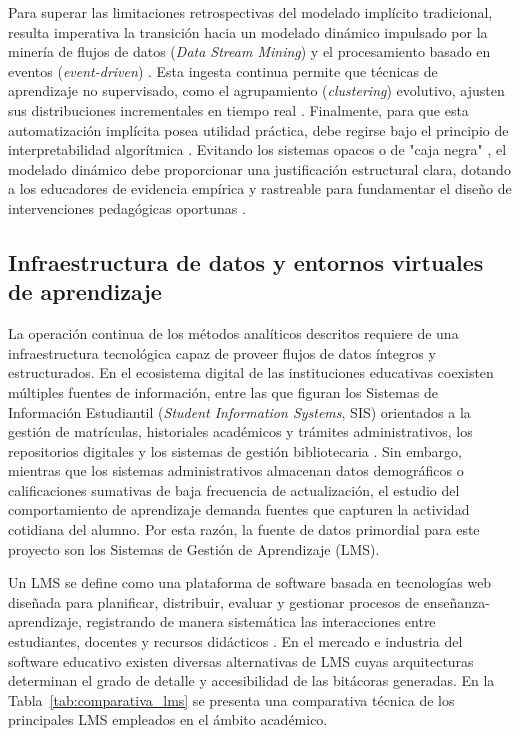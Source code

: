 Para superar las limitaciones retrospectivas del modelado implícito tradicional, resulta imperativa la transición hacia un modelado dinámico impulsado por la minería de flujos de datos (\textit{Data Stream Mining}) y el procesamiento basado en eventos (\textit{event-driven}) \cite{Zavaleta-Sanchez2025, Kundavaram2025}. Esta ingesta continua permite que técnicas de aprendizaje no supervisado, como el agrupamiento (\textit{clustering}) evolutivo, ajusten sus distribuciones incrementales en tiempo real \cite{Batool2021}. Finalmente, para que esta automatización implícita posea utilidad práctica, debe regirse bajo el principio de interpretabilidad algorítmica \cite{Lee2025}. Evitando los sistemas opacos o de "caja negra" \cite{Arrieta2020}, el modelado dinámico debe proporcionar una justificación estructural clara, dotando a los educadores de evidencia empírica y rastreable para fundamentar el diseño de intervenciones pedagógicas oportunas \cite{Desai2025}. 

\subsection{Infraestructura de datos y entornos virtuales de aprendizaje}

La operación continua de los métodos analíticos descritos requiere de una infraestructura tecnológica capaz de proveer flujos de datos íntegros y estructurados. En el ecosistema digital de las instituciones educativas coexisten múltiples fuentes de información, entre las que figuran los Sistemas de Información Estudiantil (\textit{Student Information Systems}, SIS) orientados a la gestión de matrículas, historiales académicos y trámites administrativos, los repositorios digitales y los sistemas de gestión bibliotecaria \cite{Turnbull2020}. Sin embargo, mientras que los sistemas administrativos almacenan datos demográficos o calificaciones sumativas de baja frecuencia de actualización, el estudio del comportamiento de aprendizaje demanda fuentes que capturen la actividad cotidiana del alumno. Por esta razón, la fuente de datos primordial para este proyecto son los Sistemas de Gestión de Aprendizaje (LMS).

Un LMS se define como una plataforma de software basada en tecnologías web diseñada para planificar, distribuir, evaluar y gestionar procesos de enseñanza-aprendizaje, registrando de manera sistemática las interacciones entre estudiantes, docentes y recursos didácticos \cite{Turnbull2020}. En el mercado e industria del software educativo existen diversas alternativas de LMS cuyas arquitecturas determinan el grado de detalle y accesibilidad de las bitácoras generadas. En la Tabla~\ref{tab:comparativa_lms} se presenta una comparativa técnica de los principales LMS empleados en el ámbito académico.


